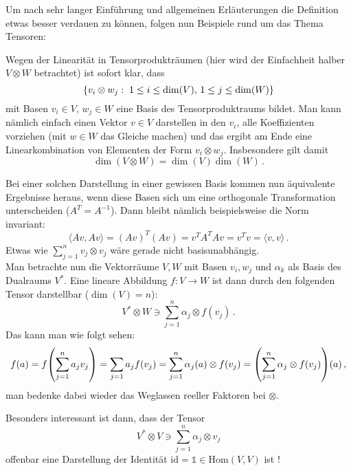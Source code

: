 \documentclass[../H_Analysis_main.tex]{subfiles}
\begin{document}
Um nach sehr langer Einführung und allgemeinen Erläuterungen die Definition etwas besser verdauen zu können, folgen nun Beispiele rund um das Thema Tensoren:
\begin{bsp}
Wegen der Linearität in Tensorprodukträumen (hier wird der Einfachheit halber $V \otimes W$ betrachtet) ist sofort klar, dass
\begin{equation}
\qty{v_i \otimes w_j: \; 1 \leq i \leq \dim(V), \, 1 \leq j \leq \dim(W)}
\end{equation}
mit Basen $v_i \in V, \, w_j \in W$ eine Basis des Tensorproduktraums bildet. Man kann nämlich einfach einen Vektor $v \in V$ darstellen in den $v_i$, alle Koeffizienten vorziehen (mit $w \in W$ das Gleiche machen) und das ergibt am Ende eine Linearkombination von Elementen der Form $v_i \otimes w_j$. Insbesondere gilt damit
\begin{equation}
\dim(V \otimes W) = \dim(V) \dim(W) \, .
\end{equation}

Bei einer solchen Darstellung in einer gewissen Basis kommen nun äquivalente Ergebnisse heraus, wenn diese Basen sich um eine orthogonale Transformation unterscheiden ($A^T = A^{-1}$). Dann bleibt nämlich beispielsweise die Norm invariant:
\begin{equation*}
\langle Av, Av \rangle = (Av)^T (Av) = v^T A^T A v = v^T v = \langle v, v \rangle \, .
\end{equation*}
Etwas wie $\sum_{j = 1}^n v_j \otimes v_j$ wäre gerade nicht basisunabhängig.\\


Man betrachte nun die Vektorräume $V, W$ mit Basen $v_i, w_j$ und $\alpha_k$ als Basis des Dualraums $V^*$. Eine lineare Abbildung $f: V \rightarrow W$ ist dann durch den folgenden Tensor darstellbar ($\dim(V) = n$):
\begin{equation}
V^* \otimes W \ni \sum_{j = 1}^n \alpha_j \otimes f(v_j) \, .
\end{equation}
Das kann man wie folgt sehen:
\begin{equation*}
f(a) = f\qty(\sum_{j = 1}^n a_j v_j) = \sum_{j = 1} a_j f(v_j) = \sum_{j = 1}^n \alpha_j(a) \otimes f(v_j) = \qty(\sum_{j = 1}^n \alpha_j \otimes f(v_j))(a) \, ,
\end{equation*}
man bedenke dabei wieder das Weglassen reeller Faktoren bei $\otimes$.

Besonders interessant ist dann, dass der Tensor
\begin{equation}
V^* \otimes V \ni \sum_{j = 1}^n \alpha_j \otimes v_j
\end{equation}
offenbar eine Darstellung der Identität $\text{id} = \mathds{1} \in \text{Hom}(V, V)$ ist !\\



\end{bsp}
\end{document}
